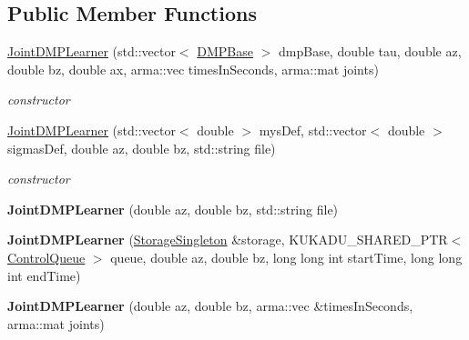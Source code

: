 \subsection*{Public Member Functions}
\begin{DoxyCompactItemize}
\item 
\hyperlink{classkukadu_1_1JointDMPLearner_a6ad6e779ad72fb3320072c52a67ac526}{Joint\+D\+M\+P\+Learner} (std\+::vector$<$ \hyperlink{classkukadu_1_1DMPBase}{D\+M\+P\+Base} $>$ dmp\+Base, double tau, double az, double bz, double ax, arma\+::vec times\+In\+Seconds, arma\+::mat joints)
\begin{DoxyCompactList}\small\item\em constructor \end{DoxyCompactList}\item 
\hyperlink{classkukadu_1_1JointDMPLearner_a0831ec240ee08b99bef99d4e2806f31f}{Joint\+D\+M\+P\+Learner} (std\+::vector$<$ double $>$ mys\+Def, std\+::vector$<$ double $>$ sigmas\+Def, double az, double bz, std\+::string file)
\begin{DoxyCompactList}\small\item\em constructor \end{DoxyCompactList}\item 
{\bfseries Joint\+D\+M\+P\+Learner} (double az, double bz, std\+::string file)\hypertarget{classkukadu_1_1JointDMPLearner_a40e29048662ca3a660993654e36db047}{}\label{classkukadu_1_1JointDMPLearner_a40e29048662ca3a660993654e36db047}

\item 
{\bfseries Joint\+D\+M\+P\+Learner} (\hyperlink{classkukadu_1_1StorageSingleton}{Storage\+Singleton} \&storage, K\+U\+K\+A\+D\+U\+\_\+\+S\+H\+A\+R\+E\+D\+\_\+\+P\+TR$<$ \hyperlink{classkukadu_1_1ControlQueue}{Control\+Queue} $>$ queue, double az, double bz, long long int start\+Time, long long int end\+Time)\hypertarget{classkukadu_1_1JointDMPLearner_ac16875d54ecac3856e9706e7a28c5033}{}\label{classkukadu_1_1JointDMPLearner_ac16875d54ecac3856e9706e7a28c5033}

\item 
{\bfseries Joint\+D\+M\+P\+Learner} (double az, double bz, arma\+::vec \&times\+In\+Seconds, arma\+::mat joints)\hypertarget{classkukadu_1_1JointDMPLearner_acf2c3a9d13fcce699d509bbc63d13ecf}{}\label{classkukadu_1_1JointDMPLearner_acf2c3a9d13fcce699d509bbc63d13ecf}

\end{DoxyCompactItemize}
